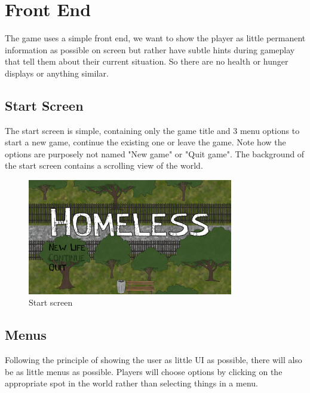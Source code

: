 \documentclass[a4paper]{scrreprt}
\begin{document}


\chapter{Front End}
The game uses a simple front end, we want to show the player as little permanent information as possible on screen but rather have subtle hints during gameplay that tell them about their current situation. So there are no health or hunger displays or anything similar.

\section{Start Screen}
The start screen is simple, containing only the game title and 3 menu options to start a new game, continue the existing one or leave the game. Note how the options are purposely not named "New game" or "Quit game". The background of the start screen contains a scrolling view of the world.
\begin{figure}[h]
\centering
\includegraphics[width=0.8\textwidth]{main_screen.png}
\caption{\label{fig:start} Start screen}
\end{figure}

\section{Menus}
Following the principle of showing the user as little UI as possible, there will also be as little menus as possible. Players will choose options by clicking on the appropriate spot in the world rather than selecting things in a menu.

\pagebreak
\end{document}
